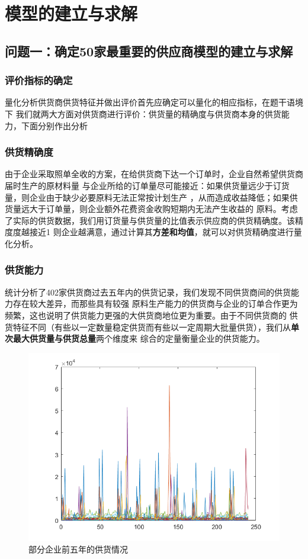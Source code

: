 \documentclass{cumcmthesis}
\begin{document}
\section{模型的建立与求解}
\subsection{问题一：确定50家最重要的供应商模型的建立与求解}

\subsubsection{评价指标的确定}
量化分析供货商供货特征并做出评价首先应确定可以量化的相应指标，在题干语境下
我们就两大方面对供货商进行评价：供货量的精确度与供货商本身的供货能力，下面分别作出分析
\subsubsection*{供货精确度}
由于企业采取照单全收的方案，在给供货商下达一个订单时，企业自然希望供货商届时生产的原材料量
与企业所给的订单量尽可能接近：如果供货量远少于订货量，则企业由于缺少必要原料无法正常按计划生产
，从而造成收益降低；如果供货量远大于订单量，则企业额外花费资金收购短期内无法产生收益的
原料。考虑了实际的供货数据，我们用订货量与供货量的比值表示供应商的供货精确度。该精度度越接近1
则企业越满意，通过计算其\textbf{方差和均值}，就可以对供货精确度进行量化分析。

\subsubsection*{供货能力}
统计分析了402家供货商过去五年内的供货记录，我们发现不同供货商间的供货能力存在较大差异，而那些具有较强
原料生产能力的供货商与企业的订单合作更为频繁，这也说明了供货能力更强的大供货商地位更为重要。由于不同供货商的
供货特征不同（有些以一定数量稳定供货而有些以一定周期大批量供货），我们从\textbf{单次最大供货量与供货总量}两个维度来
综合的定量衡量企业的供货能力。\par
\begin{figure}[htbp]
    \centering
    \includegraphics[scale=0.6]{offer.png}
    \caption{部分企业前五年的供货情况}     \label{fig:1}
\end{figure}
\end{document}
